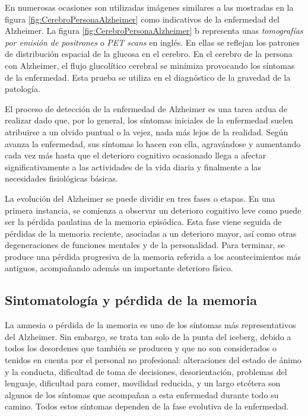 En numerosas ocasiones son utilizadas imágenes similares a las mostradas en la figura \ref{fig:CerebroPersonaAlzheimer} como indicativos de la enfermedad del Alzheimer. La figura \ref{fig:CerebroPersonaAlzheimer} b  representa unas \textit{tomografías por emisión de positrones} o \textit{PET scans} en inglés. En ellas se reflejan los patrones de distribución espacial de la glucosa en el cerebro. En el cerebro de la persona con Alzheimer, el flujo glucolítico cerebral se minimiza provocando los síntomas de la enfermedad. Esta prueba se utiliza en el diagnóstico de la gravedad de la patología.


El proceso de detección de la enfermedad de Alzheimer es una tarea ardua de realizar dado que, por lo general, los síntomas iniciales de la enfermedad suelen atribuirse a un olvido puntual o la vejez, nada más lejos de la realidad. Según avanza la enfermedad, sus síntomas lo hacen con ella, agravándose y aumentando cada vez más hasta que el deterioro cognitivo ocasionado llega a afectar significativamente a las actividades de la vida diaria y finalmente a las necesidades fisiológicas básicas.

La evolución del Alzheimer se puede dividir en tres fases o etapas. En una primera instancia, se comienza a observar un deterioro cognitivo leve como puede ser la pérdida paulatina de la memoria episódica. Esta fase viene seguida de pérdidas de la memoria reciente, asociadas a un deterioro mayor, así como otras degeneraciones de funciones mentales y de la personalidad. Para terminar, se produce una pérdida progresiva de la memoria referida a los acontecimientos más antiguos, acompañando además un importante deterioro físico.


\subsection{Sintomatología y pérdida de la memoria}
La amnesia o pérdida de la memoria es uno de los síntomas más representativos del Alzheimer. Sin embargo, se trata tan solo de la punta del iceberg, debido a todos los desordenes que también se producen y que no son considerados o tenidos en cuenta por el personal no profesional: alteraciones del estado de ánimo y la conducta, dificultad de toma de decisiones, desorientación, problemas del lenguaje, dificultad para comer, movilidad reducida, y un largo etcétera son algunos de los síntomas que acompañan a esta enfermedad durante todo su camino. Todos estos síntomas dependen de la fase evolutiva de la enfermedad.

